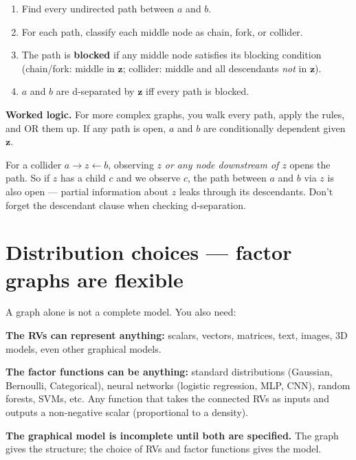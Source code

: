 \documentclass[11pt, a4paper]{article}
\begin{document}
\begin{enumerate}
  \item Find every undirected path between $a$ and $b$.
  \item For each path, classify each middle node as chain, fork, or collider.
  \item The path is \textbf{blocked} if any middle node satisfies its blocking condition (chain/fork: middle in $\mathbf{z}$; collider: middle and all descendants \emph{not} in $\mathbf{z}$).
  \item $a$ and $b$ are d-separated by $\mathbf{z}$ iff every path is blocked.
\end{enumerate}

\textbf{Worked logic.} For more complex graphs, you walk every path, apply the rules, and OR them up. If any path is open, $a$ and $b$ are conditionally dependent given $\mathbf{z}$.

\begin{pitfallbox}
For a collider $a \to z \leftarrow b$, observing $z$ \emph{or any node downstream of $z$} opens the path. So if $z$ has a child $c$ and we observe $c$, the path between $a$ and $b$ via $z$ is also open — partial information about $z$ leaks through its descendants. Don't forget the descendant clause when checking d-separation.
\end{pitfallbox}

\section{Distribution choices --- factor graphs are flexible}

A graph alone is not a complete model. You also need:

\textbf{The RVs can represent anything:} scalars, vectors, matrices, text, images, 3D models, even other graphical models.

\textbf{The factor functions can be anything:} standard distributions (Gaussian, Bernoulli, Categorical), neural networks (logistic regression, MLP, CNN), random forests, SVMs, etc. Any function that takes the connected RVs as inputs and outputs a non-negative scalar (proportional to a density).

\textbf{The graphical model is incomplete until both are specified.} The graph gives the structure; the choice of RVs and factor functions gives the model.
\end{document}
